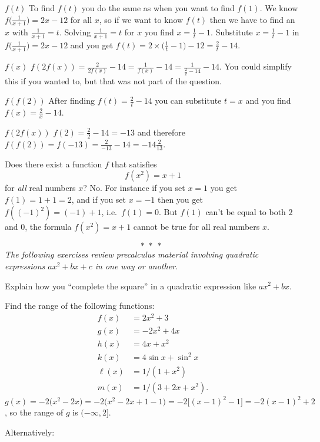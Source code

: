 \begin{multicols}{2}
\subprob $f(t)$
\answer
To find $f(t)$ you do the same as when you want to find $f(1)$.
We know $f\bigl(\frac1{x+1}\bigr) = 2x-12$ for all $x$, so if we want to know
$f(t)$ then we have to find an $x$ with $\frac{1}{x+1} = t$.  Solving $\frac{1}{x+1} = t$
for $x$ you find $x=\frac 1t -1$. Substitute $x=\frac 1t -1$ in $f\bigl(\frac1{x+1}\bigr) = 2x-12$
and you get $f(t) = 2\times\bigl(\frac{1}{t}-1\bigr)-12 = \frac{2}{t} -14 $.
\endanswer

\subprob $f(x)$
\answer 
$f(2f(x)) = \frac{2}{2f(x)} - 14 = \frac{1}{f(x)} - 14 =
\frac{1}{\frac{2}{x}-14} - 14$.  You could simplify this if you wanted to, but
that was not part of the question.
\endanswer

\subprob $f(f(2))$
\answer
After finding $f(t) = \frac{2}{t} -14 $ you can substitute $t=x$ and you find
$f(x) = \frac{2}{x} -14 $.
\endanswer

\subprob $f(2f(x))$
\answer
$f(2) = \frac{2}{2}-14 = -13 $ and therefore $f(f(2)) = f(-13) = \frac{2}{-13}-14 = -14\frac2{13} $.
\endanswer



\problem Does there exist a function $f$ that satisfies 
\[
f(x^2) = x+1
\]
for \emph{all} real numbers $x$?
\answer
No.  For instance if you set $x=1$ you get $f(1) = 1+1=2$, and if you set
$x=-1$ then you get $f((-1)^2) = (-1)+1$, i.e.\ $f(1) = 0$.  But $f(1)$
can't be equal to both $2$ and $0$, the formula $f(x^2) = x+1$ cannot be
true for all real numbers $x$.
\endanswer

\[
*\; *\; *\;
\]
\noindent\itshape%
The following exercises review precalculus material involving quadratic
expressions $ax^2+bx+c$ in one way or another.\upshape

\problem Explain how you ``complete the square'' in a quadratic expression
like $ax^2+bx$.


\problem Find the range of the following functions:
\begin{align*}
  f(x) &= 2x^2+3 \\
  g(x) &= -2x^2+4x \\
  h(x) &= 4x +x^2\\
  k(x) &= 4\sin x + \sin^2 x \\
  \ell(x) &= 1/(1+x^2)\\
  m(x) &= 1/(3+2x+x^2).
\end{align*}
\answer
$g(x) = -2\bigl(x^2-2x\bigr)
= -2\bigl(x^2-2x+1 -1\bigr)
= -2\bigl[(x-1)^2 -1\bigr]
=-2(x-1)^2 + 2$, so the range of $g$ is $(-\infty, 2]$.

Alternatively:


\end{multicols}
